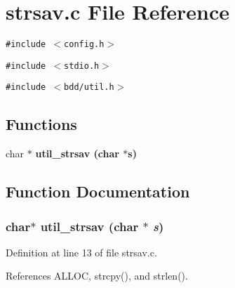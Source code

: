 \section{strsav.c File Reference}
\label{strsav_8c}
{\tt \#include $<$config.h$>$}\par
{\tt \#include $<$stdio.h$>$}\par
{\tt \#include $<$bdd/util.h$>$}\par
\subsection*{Functions}
\begin{CompactItemize}
\item 
char $\ast$ \bf{util\_\-strsav} (char $\ast$s)
\end{CompactItemize}


\subsection{Function Documentation}
\subsubsection{\setlength{\rightskip}{0pt plus 5cm}char$\ast$ util\_\-strsav (char $\ast$ {\em s})}\label{strsav_8c_084e1d746fcf456220a635909256616e}




Definition at line 13 of file strsav.c.

References ALLOC, strcpy(), and strlen().